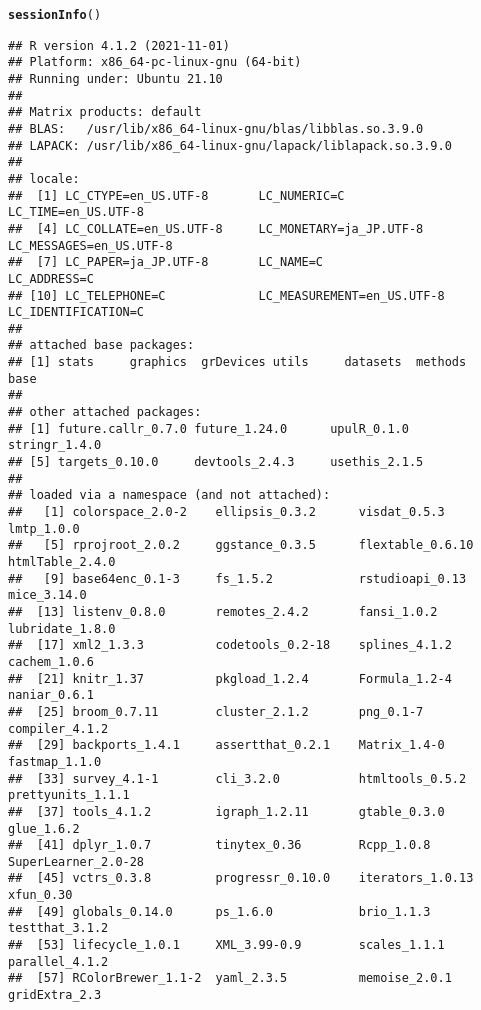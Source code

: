 \documentclass{article}\usepackage[]{graphicx}\usepackage[]{color}
\makeatletter
\newcommand{\hlstd}[1]{\textcolor[rgb]{0.345,0.345,0.345}{#1}}%
\newcommand{\hlkwd}[1]{\textcolor[rgb]{0.737,0.353,0.396}{\textbf{#1}}}%
\newenvironment{kframe}{%
 \def\at@end@of@kframe{}%
 \ifinner\ifhmode%
  \def\at@end@of@kframe{\end{minipage}}%
  \begin{minipage}{\columnwidth}%
 \fi\fi%
 \def\FrameCommand##1{\hskip\@totalleftmargin \hskip-\fboxsep
 \colorbox{shadecolor}{##1}\hskip-\fboxsep
     \hskip-\linewidth \hskip-\@totalleftmargin \hskip\columnwidth}%
 \MakeFramed {\advance\hsize-\width
   \@totalleftmargin\z@ \linewidth\hsize
   \@setminipage}}%
 {\par\unskip\endMakeFramed%
 \at@end@of@kframe}
\newenvironment{knitrout}{}{} %
\makeatother
\begin{document}
\begin{knitrout}
\color{fgcolor}\begin{kframe}
\begin{alltt}
\hlkwd{sessionInfo}\hlstd{()}
\end{alltt}
\begin{verbatim}
## R version 4.1.2 (2021-11-01)
## Platform: x86_64-pc-linux-gnu (64-bit)
## Running under: Ubuntu 21.10
## 
## Matrix products: default
## BLAS:   /usr/lib/x86_64-linux-gnu/blas/libblas.so.3.9.0
## LAPACK: /usr/lib/x86_64-linux-gnu/lapack/liblapack.so.3.9.0
## 
## locale:
##  [1] LC_CTYPE=en_US.UTF-8       LC_NUMERIC=C               LC_TIME=en_US.UTF-8       
##  [4] LC_COLLATE=en_US.UTF-8     LC_MONETARY=ja_JP.UTF-8    LC_MESSAGES=en_US.UTF-8   
##  [7] LC_PAPER=ja_JP.UTF-8       LC_NAME=C                  LC_ADDRESS=C              
## [10] LC_TELEPHONE=C             LC_MEASUREMENT=en_US.UTF-8 LC_IDENTIFICATION=C       
## 
## attached base packages:
## [1] stats     graphics  grDevices utils     datasets  methods   base     
## 
## other attached packages:
## [1] future.callr_0.7.0 future_1.24.0      upulR_0.1.0        stringr_1.4.0     
## [5] targets_0.10.0     devtools_2.4.3     usethis_2.1.5     
## 
## loaded via a namespace (and not attached):
##   [1] colorspace_2.0-2    ellipsis_0.3.2      visdat_0.5.3        lmtp_1.0.0         
##   [5] rprojroot_2.0.2     ggstance_0.3.5      flextable_0.6.10    htmlTable_2.4.0    
##   [9] base64enc_0.1-3     fs_1.5.2            rstudioapi_0.13     mice_3.14.0        
##  [13] listenv_0.8.0       remotes_2.4.2       fansi_1.0.2         lubridate_1.8.0    
##  [17] xml2_1.3.3          codetools_0.2-18    splines_4.1.2       cachem_1.0.6       
##  [21] knitr_1.37          pkgload_1.2.4       Formula_1.2-4       naniar_0.6.1       
##  [25] broom_0.7.11        cluster_2.1.2       png_0.1-7           compiler_4.1.2     
##  [29] backports_1.4.1     assertthat_0.2.1    Matrix_1.4-0        fastmap_1.1.0      
##  [33] survey_4.1-1        cli_3.2.0           htmltools_0.5.2     prettyunits_1.1.1  
##  [37] tools_4.1.2         igraph_1.2.11       gtable_0.3.0        glue_1.6.2         
##  [41] dplyr_1.0.7         tinytex_0.36        Rcpp_1.0.8          SuperLearner_2.0-28
##  [45] vctrs_0.3.8         progressr_0.10.0    iterators_1.0.13    xfun_0.30          
##  [49] globals_0.14.0      ps_1.6.0            brio_1.1.3          testthat_3.1.2     
##  [53] lifecycle_1.0.1     XML_3.99-0.9        scales_1.1.1        parallel_4.1.2     
##  [57] RColorBrewer_1.1-2  yaml_2.3.5          memoise_2.0.1       gridExtra_2.3      

\end{verbatim}
\end{kframe}
\end{knitrout}
\end{document}
